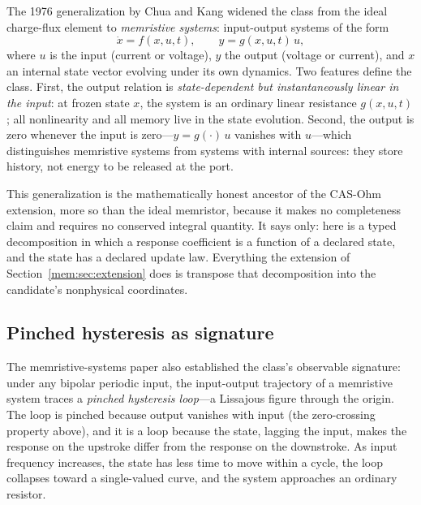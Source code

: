 The 1976 generalization by Chua and Kang \cite{chuakang76} widened the class from the ideal charge-flux element to \emph{memristive systems}: input-output systems of the form
\[
\dot x = f(x, u, t), \qquad y = g(x, u, t)\, u,
\]
where $u$ is the input (current or voltage), $y$ the output (voltage or current), and $x$ an internal state vector evolving under its own dynamics. Two features define the class. First, the output relation is \emph{state-dependent but instantaneously linear in the input}: at frozen state $x$, the system is an ordinary linear resistance $g(x,u,t)$; all nonlinearity and all memory live in the state evolution. Second, the output is zero whenever the input is zero---$y = g(\cdot)\,u$ vanishes with $u$---which distinguishes memristive systems from systems with internal sources: they store history, not energy to be released at the port.

This generalization is the mathematically honest ancestor of the CAS-Ohm extension, more so than the ideal memristor, because it makes no completeness claim and requires no conserved integral quantity. It says only: here is a typed decomposition in which a response coefficient is a function of a declared state, and the state has a declared update law. Everything the extension of Section~\ref{mem:sec:extension} does is transpose that decomposition into the candidate's nonphysical coordinates.

\subsection{Pinched hysteresis as signature}\label{mem:sec:hysteresis}

The memristive-systems paper also established the class's observable signature: under any bipolar periodic input, the input-output trajectory of a memristive system traces a \emph{pinched hysteresis loop}---a Lissajous figure through the origin. The loop is pinched because output vanishes with input (the zero-crossing property above), and it is a loop because the state, lagging the input, makes the response on the upstroke differ from the response on the downstroke. As input frequency increases, the state has less time to move within a cycle, the loop collapses toward a single-valued curve, and the system approaches an ordinary resistor.

